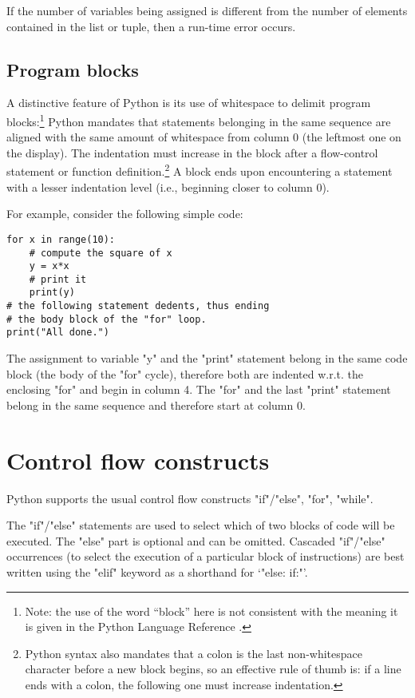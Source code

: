 {If the number of variables being assigned is different from the number
of elements contained in the list or tuple, then a run-time error
occurs.


\subsection{Program blocks}
\label{sec:blocks}

A distinctive feature of Python is its use of whitespace to delimit
program blocks:\footnote{Note: the use of the word ``block'' here is
  not consistent with the meaning it is given in the Python Language
  Reference \cite{python:reference}.}  Python mandates that statements
belonging in the same sequence are aligned with the same amount of
whitespace from column 0 (the leftmost one on the display).  The
indentation must increase in the block after a flow-control statement
or function definition.\footnote{Python syntax also mandates that a
  colon \q{:} is the last non-whitespace character before a new block
  begins, so an effective rule of thumb is: if a line ends with a
  colon, the following one must increase indentation.}  A block ends
upon encountering a statement with a lesser indentation level (i.e.,
beginning closer to column 0).

For example, consider the following simple code:
\begin{lstlisting}
for x in range(10):
    # compute the square of x
    y = x*x
    # print it
    print(y)
# the following statement dedents, thus ending
# the body block of the "for" loop.
print("All done.")
\end{lstlisting}
The assignment to variable "y" and the "print" statement belong in the
same code block (the body of the "for" cycle), therefore both are
indented w.r.t. the enclosing "for" and begin in column 4.  The "for"
and the last "print" statement belong in the same sequence and
therefore start at column 0.


\section{Control flow constructs}
\label{sec:control-flow}

Python supports the usual control flow constructs
"if"/"else", "for", "while".

The "if"/"else" statements are used to select which of two
blocks of code will be executed.  The "else" part is optional and
can be omitted.  Cascaded "if"/"else" occurrences (to
select the execution of a particular block of instructions) are best
written using the "elif" keyword as a shorthand for 
`"else: if:"'. 

}
